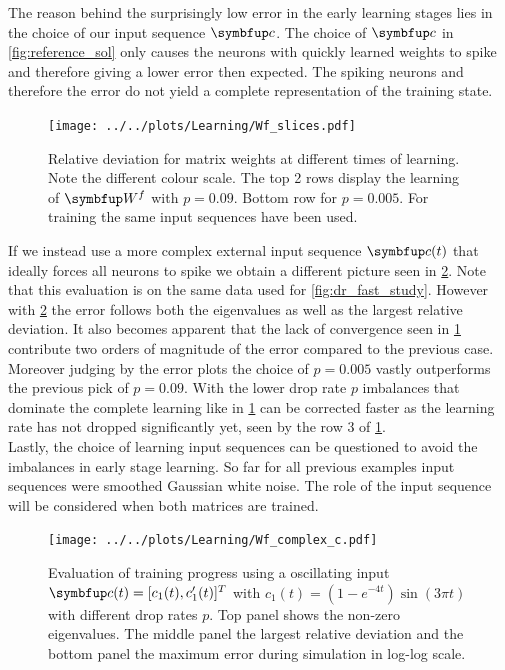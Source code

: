 The reason behind the surprisingly low error in the early learning stages lies in the choice of our input sequence $\bmu{c}$. The choice of $\bmu{c}$ in \cref{fig:reference_sol} only causes the neurons with quickly learned weights to spike and therefore giving a lower error then expected. The spiking neurons and therefore the error do not yield a complete representation of the training state.\\
\begin{figure}
	\centering
	\texttt{[image: ../../plots/Learning/Wf\_slices.pdf]}
	\caption{Relative deviation for matrix weights at different times of learning. Note the different colour scale. The top 2 rows display the learning of $\bmu{W}^f$ with $p = 0.09$. Bottom row for $p=0.005$. For training the same input sequences have been used.}
	\label{fig:Wf_slices}
\end{figure}
If we instead use a more complex external input sequence $\bmu{c}(t)$ that ideally forces all neurons to spike we obtain a different picture seen in \cref{fig:complex_seq}. Note that this evaluation is on the same data used for \cref{fig:dr_fast_study}. However with \cref{fig:complex_seq} the error follows both the eigenvalues as well as the largest relative deviation. It also becomes apparent that the lack of convergence seen in \cref{fig:Wf_slices} contribute two orders of magnitude of the error compared to the previous case. Moreover judging by the error plots the choice of $p = 0.005$ vastly outperforms the previous pick of $p= 0.09$. With the lower drop rate $p$ imbalances that dominate the complete learning like in \cref{fig:Wf_slices} can be corrected faster as the learning rate has not dropped significantly yet, seen by the row 3 of \cref{fig:Wf_slices}.\\
Lastly, the choice of learning input sequences can be questioned to avoid the imbalances in early stage learning. So far for all previous examples input sequences were smoothed Gaussian white noise. The role of the input sequence will be considered when both matrices are trained.\\
\begin{figure}
	\centering
	\texttt{[image: ../../plots/Learning/Wf\_complex\_c.pdf]}
	\caption{Evaluation of training progress using a oscillating input $\bmu{c}(t) = [c_1(t),c_1'(t)]^T$ with $c_1(t) = (1-e^{-4t})\sin(3\pi t)$ with different drop rates $p$. Top panel shows the non-zero eigenvalues. The middle panel the largest relative deviation and the bottom panel the maximum error during simulation in log-log scale.}
	\label{fig:complex_seq}
\end{figure}



